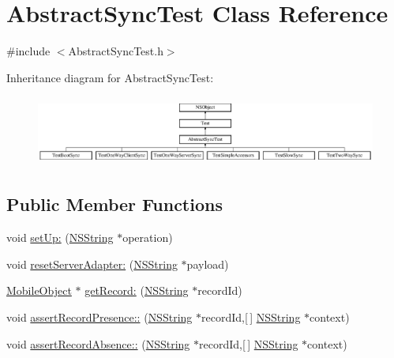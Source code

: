 \hypertarget{interface_abstract_sync_test}{
\section{\-Abstract\-Sync\-Test \-Class \-Reference}
\label{interface_abstract_sync_test}
}


{\ttfamily \#include $<$\-Abstract\-Sync\-Test.\-h$>$}

\-Inheritance diagram for \-Abstract\-Sync\-Test\-:\begin{figure}[H]
\begin{center}
\leavevmode
\includegraphics[height=2.333333cm]{interface_abstract_sync_test}
\end{center}
\end{figure}
\subsection*{\-Public \-Member \-Functions}
\begin{DoxyCompactItemize}
\item 
void \hyperlink{interface_abstract_sync_test_ae4a2262d1e10634ce74695c5bb917070}{set\-Up\-:} (\hyperlink{class_n_s_string}{\-N\-S\-String} $\ast$operation)
\item 
void \hyperlink{interface_abstract_sync_test_ac72287812c1817d576093cb5ab851d6b}{reset\-Server\-Adapter\-:} (\hyperlink{class_n_s_string}{\-N\-S\-String} $\ast$payload)
\item 
\hyperlink{interface_mobile_object}{\-Mobile\-Object} $\ast$ \hyperlink{interface_abstract_sync_test_a5c5496be71beb6469101643c08daf251}{get\-Record\-:} (\hyperlink{class_n_s_string}{\-N\-S\-String} $\ast$record\-Id)
\item 
void \hyperlink{interface_abstract_sync_test_a24594e0b8ef53b84f1c361e5340dfc3c}{assert\-Record\-Presence\-::} (\hyperlink{class_n_s_string}{\-N\-S\-String} $\ast$record\-Id,\mbox{[}$\,$\mbox{]} \hyperlink{class_n_s_string}{\-N\-S\-String} $\ast$context)
\item 
void \hyperlink{interface_abstract_sync_test_acc43ad2297ff1500915c8cea7208c2e1}{assert\-Record\-Absence\-::} (\hyperlink{class_n_s_string}{\-N\-S\-String} $\ast$record\-Id,\mbox{[}$\,$\mbox{]} \hyperlink{class_n_s_string}{\-N\-S\-String} $\ast$context)
\end{DoxyCompactItemize}
